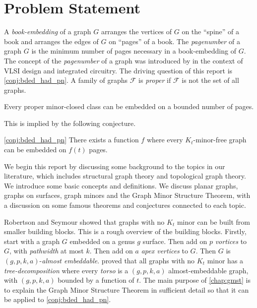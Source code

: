 \section{Problem Statement}

A \textit{book-embedding} of a graph $G$ arranges the vertices of $G$ on the ``spine'' of a book and arranges the edges of $G$ on ``pages'' of a book. The \textit{pagenumber} of a graph \(G\) is the minimum number of pages necessary in a book-embedding of \(G\). The concept of the \textit{pagenumber} of a graph was introduced by \textcite{ollmannBookThicknessVarious1973} in the context of VLSI design and integrated circuitry. 
The driving question of this report is \cref{conj:bded_had_pn}. A family of graphs $\mathcal{F}$ is \textit{proper} if $\mathcal{F}$ is not the set of all graphs. 
\begin{conjecture}\label{lem:Minor-Closed_Pagenumber}
	Every proper minor-closed class can be embedded on a bounded number of pages.
\end{conjecture}

This is implied by the following conjecture.

\begin{conjecture}\cref{conj:bded_had_pn}
	There exists a function $f$ where every $K_t$-minor-free graph can be embedded on $f(t)$ pages.
\end{conjecture}

We begin this report by discussing some background to the topics in our literature, which includes structural graph theory and topological graph theory. We introduce some basic concepts and definitions. We discuss planar graphs, graphs on surfaces, graph minors and the Graph Minor Structure Theorem, with a discussion on some famous theorems and conjectures connected to each topic. 

Robertson and Seymour showed that graphs with no \(K_t\) minor can be built from smaller building blocks. This is a rough overview of the building blocks. Firstly, start with a graph \(G\) embedded on a genus \(g\) surface. Then add on \(p\) \textit{vortices} to \(G\), with \textit{pathwidth} at most \(k\). Then add on \(a\) \textit{apex vertices} to \(G\). Then \(G\) is \((g, p, k, a)\)-\textit{almost embeddable}. \textcite{robertsonGraphMinorsXVI2003} proved that all graphs with no \(K_t\) minor has a \textit{tree-decomposition} where every \textit{torso} is a \((g, p, k, a)\) almost-embeddable graph, with \((g, p, k, a)\) bounded by a function of \(t\). The main purpose of \cref{chap:gmst} is to explain the Graph Minor Structure Theorem in sufficient detail so that it can be applied to \cref{conj:bded_had_pn}.

